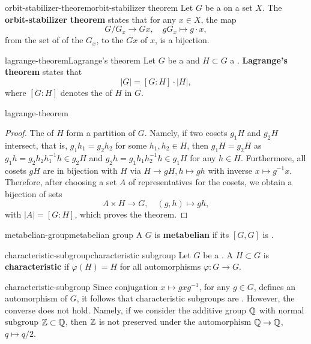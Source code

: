 \begin{topic}{orbit-stabilizer-theorem}{orbit-stabilizer theorem}
    Let $G$ be a   on a set $X$. The \textbf{orbit-stabilizer theorem} states that for any $x \in X$, the map
    \[ G/G_x \to Gx , \quad g G_x \mapsto g \cdot x , \]
    from the set of  of the  $G_x$, to the  $Gx$ of $x$, is a bijection.
\end{topic}

\begin{topic}{lagrange-theorem}{Lagrange's theorem}
    Let $G$ be a  and $H \subset G$ a . \textbf{Lagrange's theorem} states that
    \[ |G| = [G : H] \cdot |H| , \]
    where $[G : H]$ denotes the  of $H$ in $G$.
\end{topic}

\begin{example}{lagrange-theorem}
    \begin{proof}
        The  of $H$ form a partition of $G$. Namely, if two cosets $g_1 H$ and $g_2 H$ intersect, that is, $g_1 h_1 = g_2 h_2$ for some $h_1, h_2 \in H$, then $g_1 H = g_2 H$ as $g_1 h = g_2 h_2 h_1^{-1} h \in g_2 H$ and $g_2 h = g_1 h_1 h_2^{-1} h \in g_1 H$ for any $h \in H$. Furthermore, all cosets $gH$ are in bijection with $H$ via $H \to gH, h \mapsto g h$ with inverse $x \mapsto g^{-1} x$. Therefore, after choosing a set $A$ of representatives for the cosets, we obtain a bijection of sets
        \[ A \times H \to G, \quad (g, h) \mapsto gh , \]
        with $|A| = [G : H]$, which proves the theorem.
    \end{proof}
\end{example}

\begin{topic}{metabelian-group}{metabelian group}
    A  $G$ is \textbf{metabelian} if its  $[G, G]$ is .
\end{topic}

\begin{topic}{characteristic-subgroup}{characteristic subgroup}
    Let $G$ be a . A  $H \subset G$ is \textbf{characteristic} if $\varphi(H) = H$ for all automorphisms $\varphi : G \to G$.
\end{topic}

\begin{example}{characteristic-subgroup}
    Since conjugation $x \mapsto gxg^{-1}$, for any $g \in G$, defines an automorphism of $G$, it follows that characteristic subgroups are . However, the converse does not hold. Namely, if we consider the additive group $\mathbb{Q}$ with normal subgroup $\mathbb{Z} \subset \mathbb{Q}$, then $\mathbb{Z}$ is not preserved under the automorphism $\mathbb{Q} \to \mathbb{Q}$, $q \mapsto q/2$.
\end{example}

